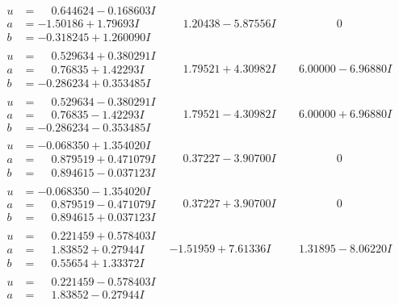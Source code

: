\documentclass[1p]{elsarticle_modified}
\theoremstyle{definition}
\begin{document}
$$\begin{array}{c|c|c}
\begin{aligned}
u &= \phantom{-}0.644624 - 0.168603 I \\
a &= -1.50186 + 1.79693 I \\
b &= -0.318245 + 1.260090 I\end{aligned}
 & \phantom{-}1.20438 - 5.87556 I & \phantom{-0.000000 } 0 \\ \hline\begin{aligned}
u &= \phantom{-}0.529634 + 0.380291 I \\
a &= \phantom{-}0.76835 + 1.42293 I \\
b &= -0.286234 + 0.353485 I\end{aligned}
 & \phantom{-}1.79521 + 4.30982 I & \phantom{-}6.00000 - 6.96880 I \\ \hline\begin{aligned}
u &= \phantom{-}0.529634 - 0.380291 I \\
a &= \phantom{-}0.76835 - 1.42293 I \\
b &= -0.286234 - 0.353485 I\end{aligned}
 & \phantom{-}1.79521 - 4.30982 I & \phantom{-}6.00000 + 6.96880 I \\ \hline\begin{aligned}
u &= -0.068350 + 1.354020 I \\
a &= \phantom{-}0.879519 + 0.471079 I \\
b &= \phantom{-}0.894615 - 0.037123 I\end{aligned}
 & \phantom{-}0.37227 - 3.90700 I & \phantom{-0.000000 } 0 \\ \hline\begin{aligned}
u &= -0.068350 - 1.354020 I \\
a &= \phantom{-}0.879519 - 0.471079 I \\
b &= \phantom{-}0.894615 + 0.037123 I\end{aligned}
 & \phantom{-}0.37227 + 3.90700 I & \phantom{-0.000000 } 0 \\ \hline\begin{aligned}
u &= \phantom{-}0.221459 + 0.578403 I \\
a &= \phantom{-}1.83852 + 0.27944 I \\
b &= \phantom{-}0.55654 + 1.33372 I\end{aligned}
 & -1.51959 + 7.61336 I & \phantom{-}1.31895 - 8.06220 I \\ \hline\begin{aligned}
u &= \phantom{-}0.221459 - 0.578403 I \\
a &= \phantom{-}1.83852 - 0.27944 I \\

\end{aligned}
\end{array}$$
\end{document}
